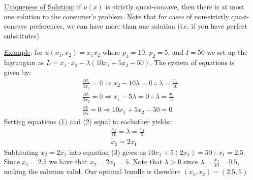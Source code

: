 \documentclass{article}
\begin{document}
  \par
  \underline{Uniqueness of Solution}: if $u(x)$ is strictly quasi-concave, then there is at most one solution to the consumer's problem. Note that for cases of non-strictly quasi-concave preferences, we can have more than one solution (i.e. if you have perfect substitutes)
  \par
  \underline{Example}: for $u(x_{1},x_{2}) = x_{1}x_{2}$ where $p_{1} = 10$, $p_{2} = 5$, and $I = 50$ we set up the lagrangian as $L = x_{1}\cdot x_{2} - \lambda(10x_{1} + 5x_{2} - 50)$. The system of equations is given by:
  \begin{align*}
    &\frac{\partial L}{\partial x_{1}} = 0 \Rightarrow x_{2} - 10\lambda = 0 \ \therefore \ \lambda = \frac{x_{2}}{10} \ \tag{1} \\
    &\frac{\partial L}{\partial x_{2}} = 0 \Rightarrow x_{1} - 5\lambda = 0 \ \therefore \ \lambda = \frac{x_{1}}{5} \ \tag{2} \\
    &\frac{\partial L}{\partial \lambda} = 0 \Rightarrow 10x_{1} + 5x_{2} - 50 = 0 \ \tag{3}
  \end{align*}
  Setting equations (1) and (2) equal to eachother yields:
  \begin{gather*}
    \frac{x_{2}}{10} = \lambda = \frac{x_{1}}{5} \\
    x_{2} = 2x_{1}
  \end{gather*}
  Subtituting $x_{2} = 2x_{1}$ into equation (3) gives us $10x_{1} + 5(2x_{1}) = 50 \ \therefore \ x_{1} = 2.5$. Since $x_{1} = 2.5$ we have that $x_{2} = 2x_{1} = 5$. Note that $\lambda > 0$ since $\lambda = \tfrac{x_{2}}{10} = 0.5$, making the solution valid. Our optimal bundle is therefore $(x_{1}, x_{2}) = (2.5, 5)$
  \par
\vspace{6mm}
\end{document}
